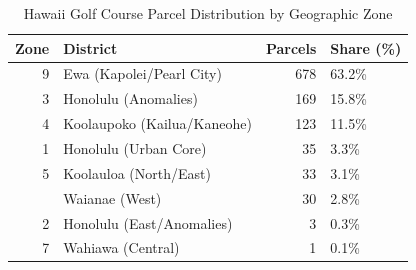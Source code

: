 \begin{table}[H]
\centering
\caption{\label{tab:hawaii_geo}Hawaii Golf Course Parcel Distribution by Geographic Zone}
\centering
\begin{tabular}[t]{rlrl}
\toprule
Zone & District & Parcels & Share (\%)\\
\midrule
9 & Ewa (Kapolei/Pearl City) & 678 & 63.2\%\\
3 & Honolulu (Anomalies) & 169 & 15.8\%\\
4 & Koolaupoko (Kailua/Kaneohe) & 123 & 11.5\%\\
1 & Honolulu (Urban Core) & 35 & 3.3\%\\
5 & Koolauloa (North/East) & 33 & 3.1\%\\
\addlinespace
8 & Waianae (West) & 30 & 2.8\%\\
2 & Honolulu (East/Anomalies) & 3 & 0.3\%\\
7 & Wahiawa (Central) & 1 & 0.1\%\\
\bottomrule
\end{tabular}
\end{table}
